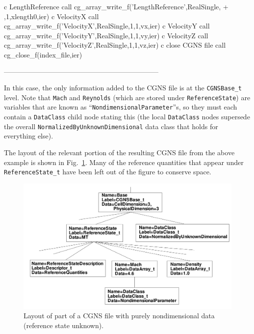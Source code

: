 \documentclass[12pt]{article}
\begin{document}
{\newline c   LengthReference
\newline\indent      call cg\_array\_write\_f('LengthReference',RealSingle,
\newline + ,1,xlength0,ier)
\newline c   VelocityX
\newline\indent      call cg\_array\_write\_f('VelocityX',RealSingle,1,1,vx,ier)
\newline c   VelocityY
\newline\indent      call cg\_array\_write\_f('VelocityY',RealSingle,1,1,vy,ier)
\newline c   VelocityZ
\newline\indent      call cg\_array\_write\_f('VelocityZ',RealSingle,1,1,vz,ier)
\newline c   close CGNS file
\newline\indent      call cg\_close\_f(index\_file,ier)
}

--------------------------------------------------------------------

In this case, the only information
added to the CGNS file is at the {\tt CGNSBase\_t} level.
Note that {\tt Mach} and {\tt Reynolds} (which are stored under
{\tt ReferenceState}) are variables that are
known as ``{\tt NondimensionalParameter}''s, so they must
each contain a {\tt DataClass} child node stating this
(the local {\tt DataClass} nodes supersede the overall
{\tt NormalizedByUnknownDimensional} data class that holds for everything else).

The layout of the relevant portion of the resulting CGNS file
from the above example is shown in Fig.~\ref{FIGtree_nondimensional}.
Many of the reference quantities that appear under
{\tt ReferenceState\_t} have been left out of the figure
to conserve space.

\begin{figure}[hpbt]
\centerline{{\includegraphics[width=150mm]{figures/tree_nondimensional}}}
\caption{Layout of part of a CGNS file with
purely nondimensional data (reference state unknown).}
\label{FIGtree_nondimensional}
\end{figure}
%
\end{document}
